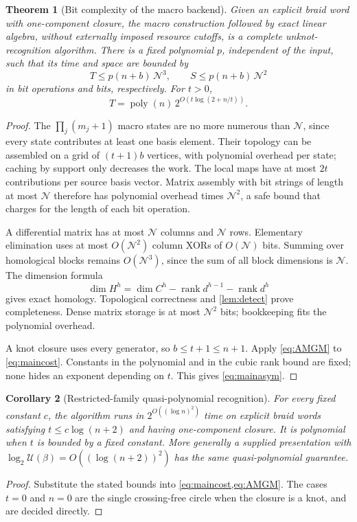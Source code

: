 \documentclass[11pt,letterpaper]{article}
\newtheorem{theorem}{Theorem}[section]
\newtheorem{corollary}[theorem]{Corollary}
\theoremstyle{definition}
\newcommand{\poly}{\operatorname{poly}}
\newcommand{\rank}{\operatorname{rank}}
\newcommand{\N}{\mathcal N}
\newcommand{\U}{\mathcal U}
\begin{document}
\begin{theorem}[Bit complexity of the macro backend]\label{thm:main}
Given an explicit braid word with one-component closure, the macro construction followed by exact linear algebra, without externally imposed resource cutoffs, is a complete unknot-recognition algorithm. There is a fixed polynomial \(p\), independent of the input, such that its time and space are bounded by
\begin{equation}\label{eq:maincost}
 T\leq p(n+b)\,\N^3,\qquad
 S\leq p(n+b)\,\N^2
\end{equation}
in bit operations and bits, respectively. For \(t>0\),
\begin{equation}\label{eq:mainasym}
 T=\poly(n)\,2^{O(t\log(2+n/t))}.
\end{equation}
\end{theorem}
\begin{proof}
The \(\prod_j(m_j+1)\) macro states are no more numerous than \(\N\), since every state contributes at least one basis element. Their topology can be assembled on a grid of \((t+1)b\) vertices, with polynomial overhead per state; caching by support only decreases the work. The local maps have at most \(2t\) contributions per source basis vector. Matrix assembly with bit strings of length at most \(\N\) therefore has polynomial overhead times \(\N^2\), a safe bound that charges for the length of each bit operation.

A differential matrix has at most \(\N\) columns and \(\N\) rows. Elementary elimination uses at most \(O(\N^2)\) column XORs of \(O(\N)\) bits. Summing over homological blocks remains \(O(\N^3)\), since the sum of all block dimensions is \(\N\). The dimension formula
\[
 \dim H^h=\dim C^h-\rank d^{h-1}-\rank d^h
\]
gives exact homology. Topological correctness and \cref{lem:detect} prove completeness. Dense matrix storage is at most \(\N^2\) bits; bookkeeping fits the polynomial overhead.

A knot closure uses every generator, so \(b\leq t+1\leq n+1\). Apply \cref{eq:AMGM} to \cref{eq:maincost}. Constants in the polynomial and in the cubic rank bound are fixed; none hides an exponent depending on \(t\). This gives \cref{eq:mainasym}.
\end{proof}

\begin{corollary}[Restricted-family quasi-polynomial recognition]\label{cor:qp}
For every fixed constant \(c\), the algorithm runs in
\(2^{O((\log n)^2)}\) time on explicit braid words satisfying
\(t\leq c\log(n+2)\) and having one-component closure. It is polynomial when \(t\) is bounded by a fixed constant. More generally a supplied presentation with
\(\log_2\U(\beta)=O((\log(n+2))^2)\) has the same quasi-polynomial guarantee.
\end{corollary}
\begin{proof}
Substitute the stated bounds into \cref{eq:maincost,eq:AMGM}. The cases \(t=0\) and \(n=0\) are the single crossing-free circle when the closure is a knot, and are decided directly.
\end{proof}
\end{document}
